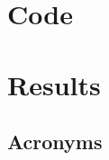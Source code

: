 \documentclass[12pt]{article}
\begin{document}
\newpage
\begin{appendices}
\section{Code}
\section{Results}

\end{appendices}

\subsection{Acronyms}


 
 
\printglossaries
\newpage
\end{document}
